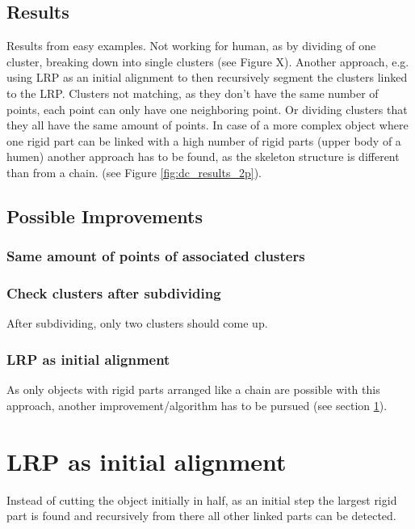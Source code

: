 \subsection{Results}

Results from easy examples. Not working for human, as by dividing of one cluster, breaking down into single clusters (see Figure X). Another approach, e.g. using LRP as an initial alignment to then recursively segment the clusters linked to the LRP. Clusters not matching, as they don't have the same number of points, each point can only have one neighboring point. Or dividing clusters that they all have the same amount of points. In case of a more complex object where one rigid part can be linked with a high number of rigid parts (upper body of a humen) another approach has to be found, as the skeleton structure is different than from a chain. (see Figure \ref{fig:dc_results_2p}).

\subsection{Possible Improvements}

\subsubsection{Same amount of points of associated clusters}

\subsubsection{Check clusters after subdividing}

After subdividing, only two clusters should come up.

\subsubsection{LRP as initial alignment}

As only objects with rigid parts arranged like a chain are possible with this approach, another improvement/algorithm has to be pursued (see section \ref{sec:LRP}).

\section{LRP as initial alignment}
\label{sec:LRP}

Instead of cutting the object initially in half, as an initial step the largest rigid part is found and recursively from there all other linked parts can be detected.

